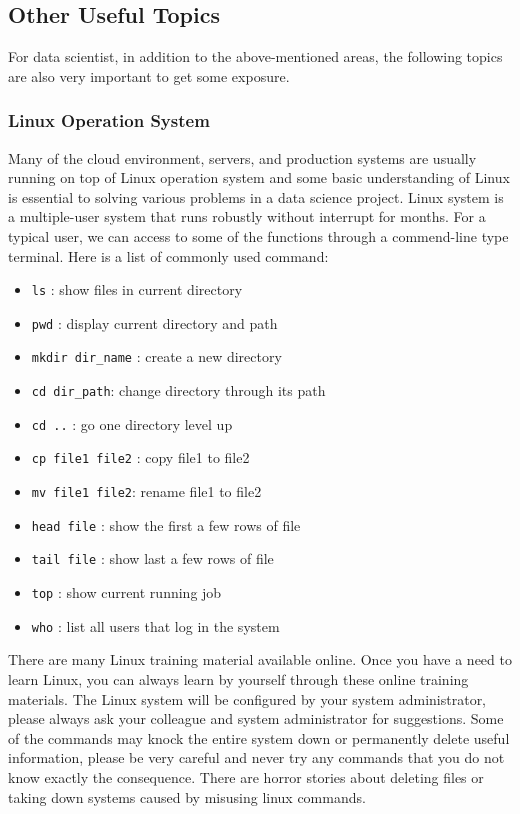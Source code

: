 \documentclass[
]{article}
\providecommand{\tightlist}{%
  \setlength{\itemsep}{0pt}\setlength{\parskip}{0pt}}
\begin{document}
\hypertarget{other-useful-topics}{%
\subsection{Other Useful Topics}\label{other-useful-topics}}

For data scientist, in addition to the above-mentioned areas, the
following topics are also very important to get some exposure.

\hypertarget{linux-operation-system}{%
\subsubsection{Linux Operation System}\label{linux-operation-system}}

Many of the cloud environment, servers, and production systems are
usually running on top of Linux operation system and some basic
understanding of Linux is essential to solving various problems in a
data science project. Linux system is a multiple-user system that runs
robustly without interrupt for months. For a typical user, we can access
to some of the functions through a commend-line type terminal. Here is a
list of commonly used command:

\begin{itemize}
\tightlist
\item
  \texttt{ls} : show files in current directory
\item
  \texttt{pwd} : display current directory and path
\item
  \texttt{mkdir\ dir\_name} : create a new directory
\item
  \texttt{cd\ dir\_path}: change directory through its path
\item
  \texttt{cd\ ..} : go one directory level up\\
\item
  \texttt{cp\ file1\ file2} : copy file1 to file2
\item
  \texttt{mv\ file1\ file2}: rename file1 to file2
\item
  \texttt{head\ file} : show the first a few rows of file
\item
  \texttt{tail\ file} : show last a few rows of file
\item
  \texttt{top} : show current running job
\item
  \texttt{who} : list all users that log in the system
\end{itemize}

There are many Linux training material available online. Once you have a
need to learn Linux, you can always learn by yourself through these
online training materials. The Linux system will be configured by your
system administrator, please always ask your colleague and system
administrator for suggestions. Some of the commands may knock the entire
system down or permanently delete useful information, please be very
careful and never try any commands that you do not know exactly the
consequence. There are horror stories about deleting files or taking
down systems caused by misusing linux commands.
\end{document}
